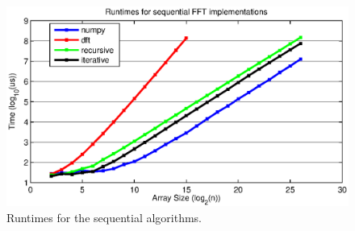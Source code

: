 \begin{figure}[h!]
\centering
\includegraphics[scale=0.9]{img/seqRuntimes.eps}
\caption{Runtimes for the sequential algorithms.}
\label{seqTimes}
\end{figure}
